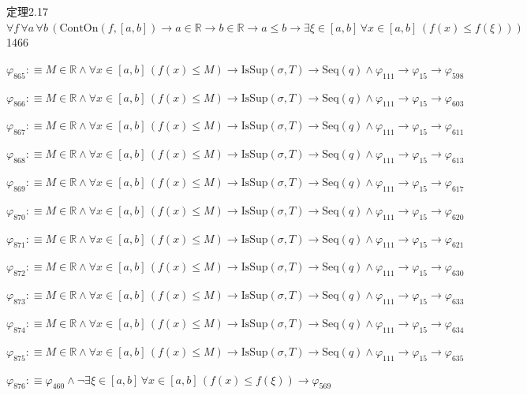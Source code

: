 \begin{fullproof}{定理2.17}{$\forall f\,\forall a\,\forall b\,(\mathrm{ContOn}(f,[a,b]) \to a \in \mathbb{R} \to b \in \mathbb{R} \to a \leq b \to \exists \xi \in [a,b]\,\forall x \in [a,b]\,(f(x) \leq f(\xi)))$}{1466}
\begin{abbrevlist}
\item $\varphi_{865} :\equiv M \in \mathbb{R} \land \forall x \in [a,b]\,(f(x) \leq M) \to \mathrm{IsSup}(\sigma,T) \to \mathrm{Seq}(q) \land \varphi_{111} \to \varphi_{15} \to \varphi_{598}$
\item $\varphi_{866} :\equiv M \in \mathbb{R} \land \forall x \in [a,b]\,(f(x) \leq M) \to \mathrm{IsSup}(\sigma,T) \to \mathrm{Seq}(q) \land \varphi_{111} \to \varphi_{15} \to \varphi_{603}$
\item $\varphi_{867} :\equiv M \in \mathbb{R} \land \forall x \in [a,b]\,(f(x) \leq M) \to \mathrm{IsSup}(\sigma,T) \to \mathrm{Seq}(q) \land \varphi_{111} \to \varphi_{15} \to \varphi_{611}$
\item $\varphi_{868} :\equiv M \in \mathbb{R} \land \forall x \in [a,b]\,(f(x) \leq M) \to \mathrm{IsSup}(\sigma,T) \to \mathrm{Seq}(q) \land \varphi_{111} \to \varphi_{15} \to \varphi_{613}$
\item $\varphi_{869} :\equiv M \in \mathbb{R} \land \forall x \in [a,b]\,(f(x) \leq M) \to \mathrm{IsSup}(\sigma,T) \to \mathrm{Seq}(q) \land \varphi_{111} \to \varphi_{15} \to \varphi_{617}$
\item $\varphi_{870} :\equiv M \in \mathbb{R} \land \forall x \in [a,b]\,(f(x) \leq M) \to \mathrm{IsSup}(\sigma,T) \to \mathrm{Seq}(q) \land \varphi_{111} \to \varphi_{15} \to \varphi_{620}$
\item $\varphi_{871} :\equiv M \in \mathbb{R} \land \forall x \in [a,b]\,(f(x) \leq M) \to \mathrm{IsSup}(\sigma,T) \to \mathrm{Seq}(q) \land \varphi_{111} \to \varphi_{15} \to \varphi_{621}$
\item $\varphi_{872} :\equiv M \in \mathbb{R} \land \forall x \in [a,b]\,(f(x) \leq M) \to \mathrm{IsSup}(\sigma,T) \to \mathrm{Seq}(q) \land \varphi_{111} \to \varphi_{15} \to \varphi_{630}$
\item $\varphi_{873} :\equiv M \in \mathbb{R} \land \forall x \in [a,b]\,(f(x) \leq M) \to \mathrm{IsSup}(\sigma,T) \to \mathrm{Seq}(q) \land \varphi_{111} \to \varphi_{15} \to \varphi_{633}$
\item $\varphi_{874} :\equiv M \in \mathbb{R} \land \forall x \in [a,b]\,(f(x) \leq M) \to \mathrm{IsSup}(\sigma,T) \to \mathrm{Seq}(q) \land \varphi_{111} \to \varphi_{15} \to \varphi_{634}$
\item $\varphi_{875} :\equiv M \in \mathbb{R} \land \forall x \in [a,b]\,(f(x) \leq M) \to \mathrm{IsSup}(\sigma,T) \to \mathrm{Seq}(q) \land \varphi_{111} \to \varphi_{15} \to \varphi_{635}$
\item $\varphi_{876} :\equiv \varphi_{460} \land \neg \exists \xi \in [a,b]\,\forall x \in [a,b]\,(f(x) \leq f(\xi)) \to \varphi_{569}$

\end{abbrevlist}
\end{fullproof}
